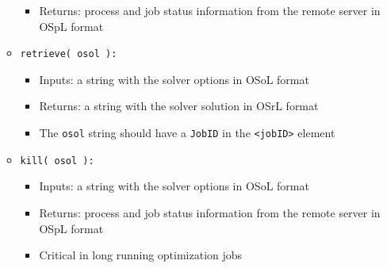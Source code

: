 \documentclass[11pt]{article}
\renewcommand{\_}{{\char"5F}}
\renewcommand{\{}{{\char"7B}}
\renewcommand{\}}{{\char"7D}}
\renewcommand{\^}{{\char"0D}}
\renewcommand{\'}{{\char"0D}}
\begin{document}
\begin{enumerate}[Step 1:]
\begin{itemize}
\begin{itemize}
\item Returns: process and job status information from the remote server in OSpL format

\end{itemize}


\item {\tt retrieve( osol ):}

\begin{itemize}

\item Inputs: a string with the solver options  in OSoL format

\item Returns: a string with the solver solution in OSrL format

\item The {\tt osol} string should have a {\tt JobID} in the {\tt <jobID>} element

\end{itemize}


\item {\tt kill( osol ):}

\begin{itemize}

\item Inputs: a string with the solver options  in OSoL format

\item Returns: process and job status information from the remote server in OSpL format

\item Critical in long running optimization jobs

\end{itemize}

\end{itemize}



\end{enumerate}
\end{document}

